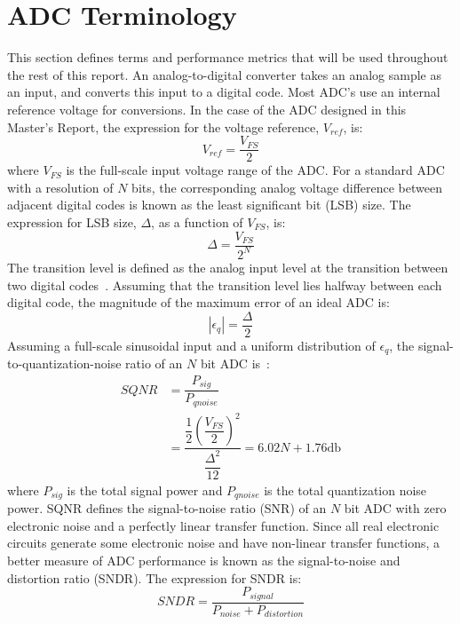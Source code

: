 \section{ADC Terminology}
This section defines terms and performance metrics that will be used throughout the rest of this report. An analog-to-digital converter takes an analog sample as an input, and converts this input to a digital code. Most ADC's 
use an internal reference voltage for conversions. In the case of the ADC designed in this Master's Report, the expression for the voltage reference, $V_{ref}$, is:
\begin{equation}
\label{eq:vref}
V_{ref} = \frac{V_{FS}}{2}
\end{equation}
where $V_{FS}$ is the full-scale input voltage range of the ADC. 
For a standard ADC with a resolution of $N$ bits, the corresponding analog voltage difference between adjacent digital codes is known as the least significant bit (LSB) size. The expression for LSB size, $\Delta$, as a function 
of $V_{FS}$, is:
\begin{equation}
\label{eq:lsbsize}
\Delta = \dfrac{V_{FS}}{2^N}
\end{equation}
The transition level is defined as the analog input level at the transition between two digital codes~\cite{advanalogch2}. Assuming that the transition level lies halfway between each digital code, the magnitude of the maximum 
error of an ideal ADC is: 
\begin{equation}
\label{eq:quanterror}
|\epsilon_{q}| = \frac{\Delta}{2}
\end{equation}
Assuming a full-scale sinusoidal input and a uniform distribution of $\epsilon_{q}$, the signal-to-quantization-noise ratio of an $N$ bit ADC is~\cite{advanalogch2}: 
\begin{align}
\label{eq:sqnr}
SQNR &= \dfrac{P_{sig}}{P_{qnoise}} \\[0.5em]
\nonumber &=\dfrac{\dfrac{1}{2}\left(\dfrac{V_{FS}}{2}\right)^{2}}{\dfrac{\Delta^{2}}{12}}=6.02N + 1.76 \si{\decibel}
\end{align}
where $P_{sig}$ is the total signal power and $P_{qnoise}$ is the total quantization noise power. SQNR defines the signal-to-noise ratio (SNR) of an $N$ bit ADC with zero electronic noise and a perfectly linear transfer function. 
Since all real electronic circuits generate some electronic noise and have non-linear transfer functions, a better measure of ADC performance is known as the signal-to-noise and distortion ratio (SNDR). The expression for SNDR 
is:  
\begin{equation}
\label{eq:sndr}
SNDR=\dfrac{P_{signal}}{P_{noise}+P_{distortion}}
\end{equation}
